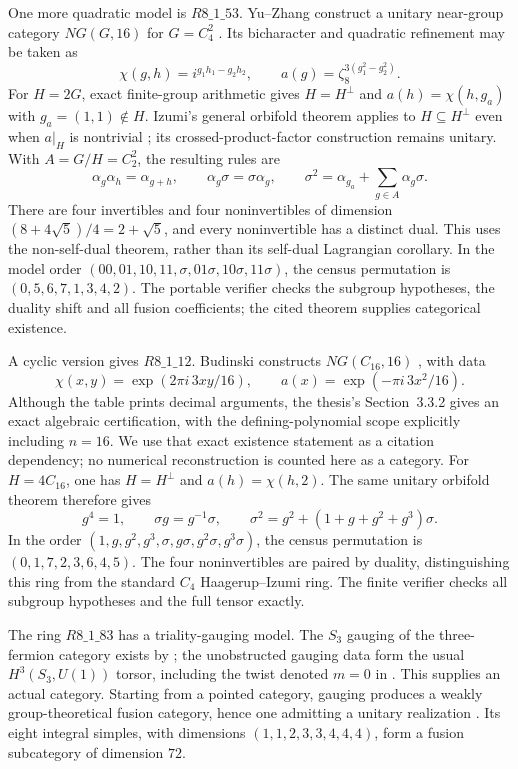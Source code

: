 \documentclass[11pt,reqno]{amsart}
\theoremstyle{definition}
\theoremstyle{remark}
\begin{document}
One more quadratic model is $R8\_1\_53$. Yu--Zhang construct a unitary near-group category $NG(G,16)$ for $G=C_4^2$ \cite[Proposition~3.1]{YuZhang}. Its bicharacter and quadratic refinement may be taken as
\[
\chi(g,h)=i^{g_1h_1-g_2h_2},\qquad
 a(g)=\zeta_8^{3(g_1^2-g_2^2)}.
\]
For $H=2G$, exact finite-group arithmetic gives $H=H^\perp$ and
$a(h)=\chi(h,g_a)$ with $g_a=(1,1)\notin H$. Izumi's general orbifold theorem applies to $H\subseteq H^\perp$ even when $a|_H$ is nontrivial \cite[Theorem~12.5]{IzumiNear}; its crossed-product-factor construction remains unitary. With $A=G/H=C_2^2$, the resulting rules are
\[
\alpha_g\alpha_h=\alpha_{g+h},\qquad
\alpha_g\sigma=\sigma\alpha_g,\qquad
\sigma^2=\alpha_{g_a}+\sum_{g\in A}\alpha_g\sigma.
\]
There are four invertibles and four noninvertibles of dimension
$(8+4\sqrt5)/4=2+\sqrt5$, and every noninvertible has a distinct dual.
This uses the non-self-dual theorem, rather than its self-dual Lagrangian corollary. In the model order $(00,01,10,11,\sigma,01\sigma,10\sigma,11\sigma)$, the census permutation is $(0,5,6,7,1,3,4,2)$. The portable verifier checks the subgroup hypotheses, the duality shift and all fusion coefficients; the cited theorem supplies categorical existence.


A cyclic version gives $R8\_1\_12$. Budinski constructs $NG(C_{16},16)$ \cite[Theorem~3.1.1 and Table~3.1]{Budinski}, with data
\[
\chi(x,y)=\exp(2\pi i\,3xy/16),\qquad
 a(x)=\exp(-\pi i\,3x^2/16).
\]
Although the table prints decimal arguments, the thesis's Section~3.3.2 gives an exact algebraic certification, with the defining-polynomial scope explicitly including $n=16$. We use that exact existence statement as a citation dependency; no numerical reconstruction is counted here as a category. For $H=4C_{16}$, one has $H=H^\perp$ and $a(h)=\chi(h,2)$. The same unitary orbifold theorem \cite[Theorem~12.5]{IzumiNear} therefore gives
\[
g^4=1,\qquad \sigma g=g^{-1}\sigma,\qquad
\sigma^2=g^2+(1+g+g^2+g^3)\sigma.
\]
In the order $(1,g,g^2,g^3,\sigma,g\sigma,g^2\sigma,g^3\sigma)$, the census permutation is $(0,1,7,2,3,6,4,5)$. The four noninvertibles are paired by duality, distinguishing this ring from the standard $C_4$ Haagerup--Izumi ring. The finite verifier checks all subgroup hypotheses and the full tensor exactly.


The ring $R8\_1\_83$ has a triality-gauging model. The $S_3$ gauging of the three-fermion category exists by \cite[Section~6.2]{Gauging}; the unobstructed gauging data form the usual $H^3(S_3,U(1))$ torsor, including the twist denoted $m=0$ in \cite[Section~VI.D and Table~IX]{THF}. This supplies an actual category. Starting from a pointed category, gauging produces a weakly group-theoretical fusion category, hence one admitting a unitary realization \cite[Theorem~5.20]{GHR}. Its eight integral simples, with dimensions $(1,1,2,3,3,4,4,4)$, form a fusion subcategory of dimension $72$.
\end{document}
